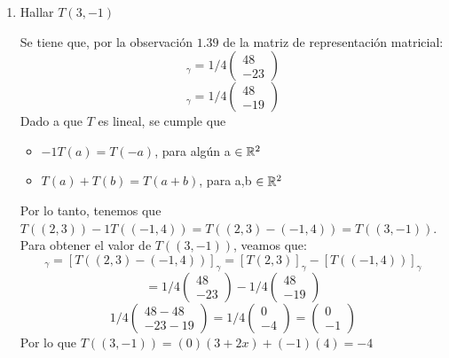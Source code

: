 \begin{enumerate}
    \item Hallar $T(3,-1)$

    Se tiene que, por la observación $1.39$ de la matriz de representación matricial:
    \begin{equation*}
        [T(2,3)]_{\gamma}= 1/4
            \begin{pmatrix}
            48\\
            -23
        \end{pmatrix}
    \end{equation*}
    \begin{equation*}
        [T((-1,4))]_{\gamma}= 1/4
        \begin{pmatrix}
            48\\
            -19
        \end{pmatrix}
    \end{equation*}
    Dado a que $T$ es lineal, se cumple que 
    \begin{itemize}
        \item $-1T(a)=T(-a)$, para algún a $\in \mathbb{R}^2$
        \item $T(a) + T(b) = T(a+b)$, para a,b $\in \mathbb{R}^2$
    \end{itemize}
        Por lo tanto, tenemos que $T((2,3))-1T((-1,4))=T((2,3)-(-1,4))=T((3,-1))$. Para obtener el valor de $T((3,-1))$, veamos que:
    \begin{equation*}
        [T((3,-1))]_\gamma=[T((2,3)-(-1,4))]_{\gamma}=[T(2,3)]_{\gamma}-[T((-1,4))]_{\gamma}
    \end{equation*}
    \begin{equation*}
        = 1/4\begin{pmatrix}
            48\\
            -23
        \end{pmatrix}
        -1/4 \begin{pmatrix}
            48\\
            -19
        \end{pmatrix}
    \end{equation*}
    \begin{equation*}
        1/4 \begin{pmatrix}
        48-48\\
        -23-19
        \end{pmatrix}
        =1/4\begin{pmatrix}
        0\\
        -4
        \end{pmatrix}
        =\begin{pmatrix}
        0\\
        -1
        \end{pmatrix}
    \end{equation*}
    Por lo que $T((3,-1)) = (0)(3 + 2x) + (-1)(4) = -4$\\


\end{enumerate}
